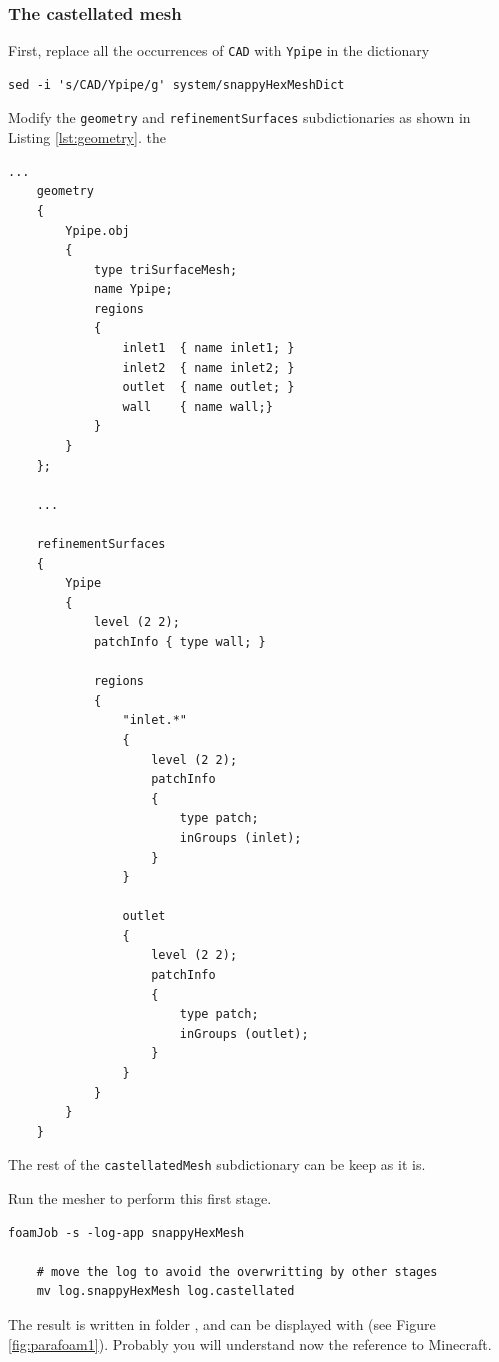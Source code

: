 \documentclass[
parskip=half,      %
DIV=12,            %
headings=normal,   %
fontsize=11pt,     %
english            %
]{scrartcl}
\begin{document}
	\subsubsection{The castellated mesh}
	
	First, replace all the occurrences of \texttt{CAD} with \texttt{Ypipe} in the dictionary
	
	\begin{lstlisting}[style=terminal]
		sed -i 's/CAD/Ypipe/g' system/snappyHexMeshDict
	\end{lstlisting}
	
	Modify the \texttt{geometry} and \texttt{refinementSurfaces} subdictionaries as shown in Listing \ref{lst:geometry}.
	the \text
	
	\begin{lstlisting}[style=output, caption={\texttt{geometry} subdictionary},
		label={lst:geometry}]
	...
	geometry
	{
		Ypipe.obj
		{
			type triSurfaceMesh;
			name Ypipe;
			regions
			{
				inlet1  { name inlet1; }
				inlet2  { name inlet2; }
				outlet  { name outlet; }
				wall    { name wall;}
			}
		}
	};
	
	...

	refinementSurfaces
	{
		Ypipe
		{
			level (2 2);
			patchInfo { type wall; }
			
			regions
			{
				"inlet.*"
				{
					level (2 2);
					patchInfo
					{
						type patch;
						inGroups (inlet);
					}
				}
				
				outlet
				{
					level (2 2);
					patchInfo
					{
						type patch;
						inGroups (outlet);
					}
				}
			}
		}
	}
		\end{lstlisting}


The rest of the \texttt{castellatedMesh} subdictionary can be keep as it is.

Run the mesher to perform this first stage.

	\begin{lstlisting}[style=terminal]
	foamJob -s -log-app snappyHexMesh
	
	# move the log to avoid the overwritting by other stages
	mv log.snappyHexMesh log.castellated
	\end{lstlisting}
	
	The result is written in folder , 
	and can be displayed with  (see Figure \ref{fig:parafoam1}). 
	Probably you will understand now the reference to Minecraft.
	
\end{document}
